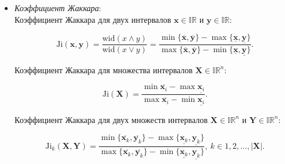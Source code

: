\documentclass[10pt]{article}
\begin{document}
\begin{itemize}
  Для элементов выборки \( \mathbf{X} \) можно определить линейный порядок,
  используя любое из пяти вышеуказанных отношений порядка на
  \( \mathbb{IR} \). То есть, если \( i \ne j \), то либо
  \( x_i \leqslant x_j \), либо \( x_i \geqslant x_j \) для любого из
  этих отношений порядка.

  Медиана Пролубникова \( \text{med}_P \mathbf{X} \) выборки
  \( \mathbf{X} \) --- это интервал \( \mathbf{x}_m \), для которого
  половина интервалов из \( \mathbf{X} \) лежит слева, а половина
  --- справа.

  В ситуации, когда имеются два элемента подинтервала \( \mathbf{x}_m \)
  и \( \mathbf{x}_{m+1} \), расположенных посередине вариационного ряда,
  \( \mathbf{x}_m \ne \mathbf{x}_{m+1} \) медиана может быть определена
  естественным обобщением взятия полусуммы точечных значений,
  расположенных посередине ряда из точечных значений, в случае
  интервальной выборки взятие полусуммы интервалов \( \mathbf{x}_m \)
  и \( \mathbf{x}_{m+1} \):
    \begin{equation*}
    \text{med}_P \mathbf{X} = (\mathbf{x}_m + \mathbf{x}_{m+1}) / 2.
  \end{equation*}
\item \textit{Коэффициент Жаккара}:\\
 Коэффициент Жаккара для двух интервалов \( \mathbf{x} \in \mathbb{IR} \)
  и \( \mathbf{y} \in \mathbb{IR} \):

  \begin{equation*}
    \text{Ji} (\mathbf{x}, \mathbf{y})
      = \frac{\text{wid} (x \land y)}{\text{wid} (x \lor y)}
      = \frac{\min \{ \overline{\mathbf{x}}, \overline{\mathbf{y}} \} - \max \{ \underline{\mathbf{x}}, \underline{\mathbf{y}} \}}
        {\max\{ \overline{\mathbf{x}}, \overline{\mathbf{y}} \} - \min \{ \underline{\mathbf{x}}, \underline{\mathbf{y}} \}}.
  \end{equation*}

  Коэффициент Жаккара для множества интервалов
  \( \mathbf{X} \in \mathbb{IR}^n \):

  \begin{equation*}
    \text{Ji} (\mathbf{X})
      = \frac{\min \overline{\mathbf{x}_i} - \max \underline{\mathbf{x}_i}}
        {\max \overline{\mathbf{x}_i} - \min \underline{\mathbf{x}_i}}.
  \end{equation*}

  Коэффициент Жаккара для двух множеств интервалов
  \( \mathbf{X} \in \mathbb{IR}^n \) и \( \mathbf{Y} \in \mathbb{IR}^n \):

  \begin{equation*}
    \text{Ji}_k (\mathbf{X}, \mathbf{Y})
      = \frac{\min \{ \overline{\mathbf{x}_k}, \overline{\mathbf{y}_k} \} - \max \{ \underline{\mathbf{x}_k}, \underline{\mathbf{y}_k} \}}
        {\max\{ \overline{\mathbf{x}_k}, \overline{\mathbf{y}_k} \} - \min \{ \underline{\mathbf{x}_k}, \underline{\mathbf{y}_k} \}},
      \ k \in 1, 2, \dots, |\mathbf{X}|.
  \end{equation*}
\end{itemize}
\end{document}
